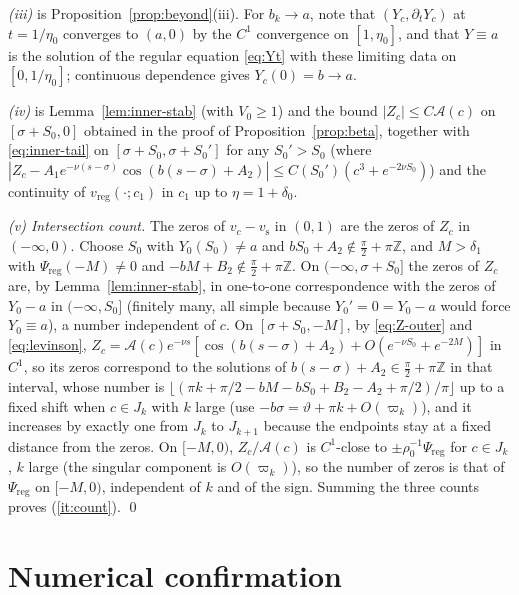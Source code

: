 \documentclass[11pt,a4paper]{amsart}
\theoremstyle{definition}
\theoremstyle{remark}
\newcommand{\Z}{\mathbb{Z}}
\newcommand{\vs}{v_{\mathrm{s}}}
\newcommand{\vreg}{v_{\mathrm{reg}}}
\newcommand{\Preg}{\Psi_{\mathrm{reg}}}
\begin{document}
\emph{(iii)} is Proposition~\ref{prop:beyond}(iii).  For $b_k\to a$, note that $(Y_c,\partial_tY_c)$ at $t=1/\eta_0$ converges to $(a,0)$ by the $C^1$ convergence on $[1,\eta_0]$, and that $Y\equiv a$ is the solution of the regular equation \eqref{eq:Yt} with these limiting data on $[0,1/\eta_0]$; continuous dependence gives $Y_c(0)=b\to a$.

\emph{(iv)} is Lemma~\ref{lem:inner-stab} (with $V_0\ge1$) and the bound $|Z_c|\le C\mathcal A(c)$ on $[\sigma+S_0,0]$ obtained in the proof of Proposition~\ref{prop:beta}, together with \eqref{eq:inner-tail} on $[\sigma+S_0,\sigma+S_0']$ for any $S_0'>S_0$ (where $|Z_c-A_1e^{-\nu(s-\sigma)}\cos(b(s-\sigma)+A_2)|\le C(S_0')(c^3+e^{-2\nu S_0})$) and the continuity of $\vreg(\cdot;c_1)$ in $c_1$ up to $\eta=1+\delta_0$.

\emph{(v) Intersection count.}  The zeros of $v_c-\vs$ in $(0,1)$ are the zeros of $Z_c$ in $(-\infty,0)$.  Choose $S_0$ with $Y_0(S_0)\ne a$ and $bS_0+A_2\notin\frac\pi2+\pi\Z$, and $M>\delta_1$ with $\Preg(-M)\ne0$ and $-bM+B_2\notin\frac\pi2+\pi\Z$.  On $(-\infty,\sigma+S_0]$ the zeros of $Z_c$ are, by Lemma~\ref{lem:inner-stab}, in one-to-one correspondence with the zeros of $Y_0-a$ in $(-\infty,S_0]$ (finitely many, all simple because $Y_0'=0=Y_0-a$ would force $Y_0\equiv a$), a number independent of $c$.  On $[\sigma+S_0,-M]$, by \eqref{eq:Z-outer} and \eqref{eq:levinson}, $Z_c=\mathcal A(c)e^{-\nu s}[\cos(b(s-\sigma)+A_2)+O(e^{-\nu S_0}+e^{-2M})]$ in $C^1$, so its zeros correspond to the solutions of $b(s-\sigma)+A_2\in\frac\pi2+\pi\Z$ in that interval, whose number is $\lfloor(\pi k+\pi/2-bM-bS_0+B_2-A_2+\pi/2)/\pi\rfloor$ up to a fixed shift when $c\in J_k$ with $k$ large (use $-b\sigma=\vartheta+\pi k+O(\varpi_k)$), and it increases by exactly one from $J_k$ to $J_{k+1}$ because the endpoints stay at a fixed distance from the zeros.  On $[-M,0)$, $Z_c/\mathcal A(c)$ is $C^1$-close to $\pm\rho_0^{-1}\Preg$ for $c\in J_k$, $k$ large (the singular component is $O(\varpi_k)$), so the number of zeros is that of $\Preg$ on $[-M,0)$, independent of $k$ and of the sign.  Summing the three counts proves (\ref{it:count}).
\qed

\section{Numerical confirmation}\label{sec:numerics}
\end{document}

